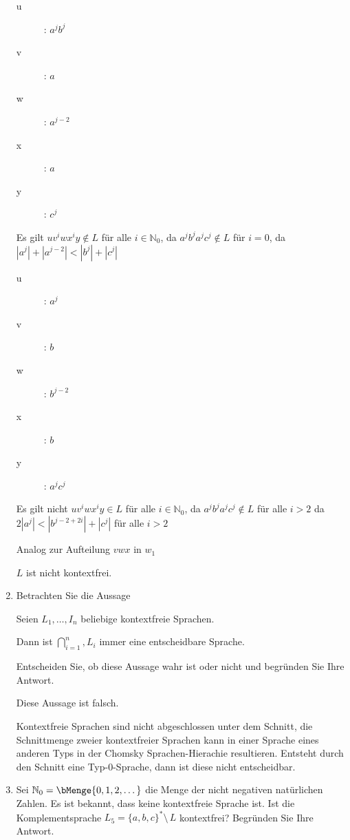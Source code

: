 \documentclass{bschlangaul-aufgabe}
\begin{document}
\begin{enumerate}
\begin{liAntwort}
\begin{description}
\item[u]: $a^j b^j$
\item[v]: $a$
\item[w]: $a^{j - 2}$
\item[x]: $a$
\item[y]: $c^j$
\end{description}

Es gilt $uv^iwx^iy \notin L$ für alle $i \in \mathbb{N}_0$, da $a^j
b^j a^j c^j \notin L$ für $i = 0$, da
$|a^j| + |a^{j-2}| < |b^j| + |c^j|$


\begin{description}
\item[u]: $a^j$
\item[v]: $b$
\item[w]: $b^{j - 2}$
\item[x]: $b$
\item[y]: $a^j c^j$
\end{description}

Es gilt nicht $uv^iwx^iy \in L$ für alle $i \in \mathbb{N}_0$, da $a^j
b^j a^j c^j \notin L$ für alle $i > 2$ da
$2|a^j| < |b^{j - 2 + 2i}| + |c^j|$ für alle $i > 2$


Analog zur Aufteilung $vwx$ in $w_1$

\Rightarrow $L$ ist nicht kontextfrei.
\end{liAntwort}


\item Betrachten Sie die Aussage

\bigskip

\centerline{Seien $L_1, \dots, I_n$ beliebige kontextfreie Sprachen.}

\centerline{Dann ist $\bigcap_{i=1}^n, L_i$ immer eine entscheidbare
Sprache.}

\bigskip

Entscheiden Sie, ob diese Aussage wahr ist oder nicht und begründen Sie
Ihre Antwort.

\begin{liAntwort}
Diese Aussage ist falsch.

Kontextfreie Sprachen sind nicht abgeschlossen unter dem Schnitt, \dh
die Schnittmenge zweier kontextfreier Sprachen kann in einer Sprache
eines anderen Typs in der Chomsky Sprachen-Hierachie resultieren.
Entsteht durch den Schnitt eine Typ-0-Sprache, dann ist diese nicht
entscheidbar.
\end{liAntwort}


\item Sei $\mathbb{N}_0 = \bMenge{0,1,2,\dots}$ die Menge der nicht
negativen natürlichen Zahlen. Es ist bekannt, dass  keine kontextfreie Sprache ist. Ist die
Komplementsprache $L_5 = \{a, b, c \}^* \setminus \, L$ kontextfrei?
Begründen Sie Ihre Antwort.

\end{enumerate}
\end{document}
